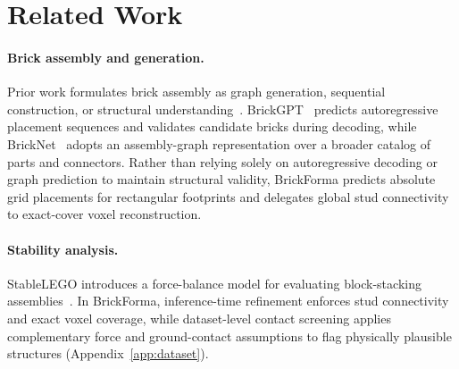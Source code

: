 \section{Related Work}
\paragraph{Brick assembly and generation.}
Prior work formulates brick assembly as graph generation, sequential construction, or structural understanding~\cite{thompson2020lego,brickbybrick,breakandmake}. BrickGPT~\cite{brickgpt} predicts autoregressive placement sequences and validates candidate bricks during decoding, while BrickNet~\cite{bricknet} adopts an assembly-graph representation over a broader catalog of parts and connectors. Rather than relying solely on autoregressive decoding or graph prediction to maintain structural validity, BrickForma predicts absolute grid placements for rectangular footprints and delegates global stud connectivity to exact-cover voxel reconstruction.

\paragraph{Stability analysis.}
StableLEGO introduces a force-balance model for evaluating block-stacking assemblies~\cite{stablelego}. In BrickForma, inference-time refinement enforces stud connectivity and exact voxel coverage, while dataset-level contact screening applies complementary force and ground-contact assumptions to flag physically plausible structures (Appendix~\ref{app:dataset}).
